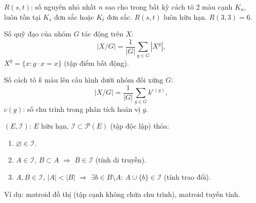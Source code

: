 \documentclass[12pt,a4paper]{article}
\begin{document}
\begin{dinhly}[title={Ramsey}]
  $R(s, t)$: số nguyên nhỏ nhất $n$ sao cho trong bất kỳ cách tô 2 màu cạnh $K_n$, luôn tồn tại $K_s$ đơn sắc hoặc $K_t$ đơn sắc. $R(s, t)$ luôn hữu hạn. $R(3,3) = 6$.
\end{dinhly}

\begin{dinhly}[title={Bổ đề Burnside (Cauchy--Frobenius)}]
  Số quỹ đạo của nhóm $G$ tác động trên $X$:
  \[
    |X/G| = \frac{1}{|G|}\sum_{g \in G} |X^g|,
  \]
  $X^g = \{x : g \cdot x = x\}$ (tập điểm bất động).
\end{dinhly}

\begin{dinhly}[title={Đếm Pólya}]
  Số cách tô $k$ màu lên cấu hình dưới nhóm đối xứng $G$:
  \[
    |X/G| = \frac{1}{|G|}\sum_{g \in G} k^{c(g)},
  \]
  $c(g)$: số chu trình trong phân tích hoán vị $g$.
\end{dinhly}

\begin{dinhnghia}[title={Matroid}]
  $(E, \mathcal{I})$: $E$ hữu hạn, $\mathcal{I} \subset \mathcal{P}(E)$ (tập độc lập) thỏa:
  \begin{enumerate}
    \item $\varnothing \in \mathcal{I}$.
    \item $A \in \mathcal{I}$, $B \subset A$ $\Rightarrow$ $B \in \mathcal{I}$ (tính di truyền).
    \item $A, B \in \mathcal{I}$, $|A| < |B|$ $\Rightarrow$ $\exists b \in B \setminus A$: $A \cup \{b\} \in \mathcal{I}$ (tính trao đổi).
  \end{enumerate}
  Ví dụ: matroid đồ thị (tập cạnh không chứa chu trình), matroid tuyến tính.
\end{dinhnghia}
\end{document}
